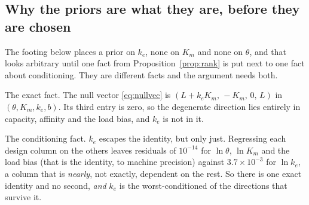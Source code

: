 \subsection{Why the priors are what they are, before they are chosen}
\label{sec:whypriors}

The footing below places a prior on $k_e$, none on $K_m$ and none on $\theta$, and that
looks arbitrary until one fact from Proposition~\ref{prop:rank} is put next to one fact
about conditioning. They are different facts and the argument needs both.

The exact fact. The null vector \eqref{eq:nullvec} is
$(L + k_e K_m,\, -K_m,\, 0,\, L)$ in $(\theta, K_m, k_e, b)$. Its third entry is zero, so
the degenerate direction lies entirely in capacity, affinity and the load bias, and $k_e$
is not in it.

The conditioning fact. $k_e$ escapes the identity, but only just. Regressing each
design column on the others leaves residuals of $10^{-14}$ for $\ln\theta$, $\ln K_m$ and
the load bias (that is the identity, to machine precision) against
$3.7\times10^{-3}$ for $\ln k_e$, a column that is \emph{nearly}, not exactly, dependent on
the rest. So there is one exact identity and no second, \emph{and} $k_e$ is the
worst-conditioned of the directions that survive it.

